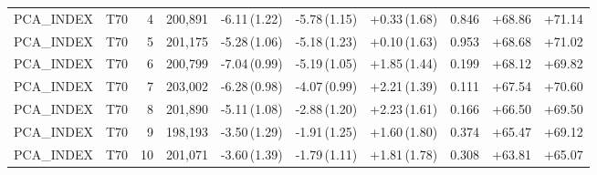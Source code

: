 \begin{table}[ht]
{\begin{tabular}{llrrrrrrrr}
PCA_INDEX & T70 & 4 & 200,891 & -6.11\,(1.22) & -5.78\,(1.15) & +0.33\,(1.68) & 0.846 & +68.86 & +71.14 \\
PCA_INDEX & T70 & 5 & 201,175 & -5.28\,(1.06) & -5.18\,(1.23) & +0.10\,(1.63) & 0.953 & +68.68 & +71.02 \\
PCA_INDEX & T70 & 6 & 200,799 & -7.04\,(0.99) & -5.19\,(1.05) & +1.85\,(1.44) & 0.199 & +68.12 & +69.82 \\
PCA_INDEX & T70 & 7 & 203,002 & -6.28\,(0.98) & -4.07\,(0.99) & +2.21\,(1.39) & 0.111 & +67.54 & +70.60 \\
PCA_INDEX & T70 & 8 & 201,890 & -5.11\,(1.08) & -2.88\,(1.20) & +2.23\,(1.61) & 0.166 & +66.50 & +69.50 \\
PCA_INDEX & T70 & 9 & 198,193 & -3.50\,(1.29) & -1.91\,(1.25) & +1.60\,(1.80) & 0.374 & +65.47 & +69.12 \\
PCA_INDEX & T70 & 10 & 201,071 & -3.60\,(1.39) & -1.79\,(1.11) & +1.81\,(1.78) & 0.308 & +63.81 & +65.07 \\
\bottomrule
\end{tabular}%
}
\end{table}
